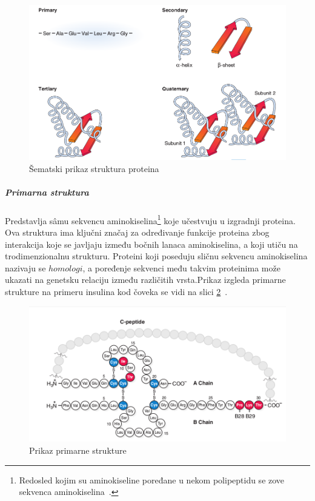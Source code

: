 \begin{figure}[h]
	\centering
    \includegraphics[width=1\textwidth]{Figures/BO/structure_schema.png}
    \caption{Šematski prikaz struktura proteina~\cite{bmbg}}
    \label{fig:structures2}
\end{figure}
\subparagraph{Primarna struktura}
Predstavlja s\^amu sekvencu aminokiselina\footnote{Redosled kojim su aminokiseline poređane u nekom polipeptidu se zove sekvenca aminokiselina~\cite{spasic}.} koje učestvuju u izgradnji proteina. Ova struktura ima ključni značaj za određivanje funkcije proteina zbog interakcija koje se javljaju između bočnih lanaca aminokiselina, a koji utiču na trodimenzionalnu strukturu. Proteini koji poseduju sličnu sekvencu aminokiselina nazivaju se $homologi$, a poređenje sekvenci među takvim proteinima može ukazati na genetsku relaciju između različitih vrsta.Prikaz izgleda primarne strukture na primeru insulina kod čoveka se vidi na slici \ref{fig:insulin}~\cite{spasic}.\\
\begin{figure}[h]
	\centering
    \includegraphics[width=1\textwidth]{Figures/BO/insulin.png}
    \caption{Prikaz primarne strukture~\cite{bmbg}}
    \label{fig:insulin}
\end{figure}

